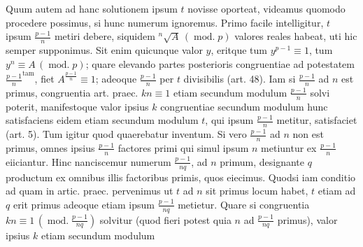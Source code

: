 
Quum autem ad hanc solutionem ipsum $t$ novisse oporteat, videamus quomodo procedere possimus, si hunc numerum ignoremus. Primo facile intelligitur, $t$ ipsum $\frac{p-1}{n}$ metiri debere, siquidem ${}^{n}\!\surd {A}\,(\operatorname{mod.}p)$ valores reales habeat, uti hic semper supponimus. Sit enim quicunque valor $y$, eritque tum $y^{p-1}\equiv1$, tum $y^n\equiv A\,(\operatorname{mod.}p)$; quare elevando partes posterioris congruentiae ad potestatem $\frac{p-1}{n}^{\mathrm{tam}}$, fiet $A^{\frac{p-1}{n}}\equiv1$; adeoque $\frac{p-1}{n}$ per $t$ divisibilis (art. 48). Iam si $\frac{p-1}{n}$ ad $n$ est primus, congruentia art. praec. $kn\equiv1$ etiam secundum modulum $\frac{p-1}{n}$ solvi poterit, manifestoque valor ipsius $k$ congruentiae secundum modulum hunc satisfaciens eidem etiam secundum modulum $t$, qui ipsum $\frac{p-1}{n}$ metitur, satisfaciet (art. 5). Tum igitur quod quaerebatur inventum. Si vero $\frac{p-1}{n}$ ad $n$ non est primus, omnes ipsius $\frac{p-1}{n}$ factores primi qui simul ipsum $n$ metiuntur ex $\frac{p-1}{n}$ eiiciantur. Hinc nanciscemur numerum $\frac{p-1}{nq}$, ad $n$ primum, designante $q$ productum ex omnibus illis factoribus primis, quos eiecimus. Quodsi iam conditio ad quam in artic. praec. pervenimus ut $t$ ad $n$ sit primus locum habet, $t$ etiam ad $q$ erit primus adeoque etiam ipsum $\frac{p-1}{nq}$ metietur. Quare si congruentia $kn\equiv1\,(\operatorname{mod.}\frac{p-1}{nq})$ solvitur (quod fieri potest quia $n$ ad $\frac{p-1}{nq}$ primus), valor ipsius $k$ etiam secundum modulum
